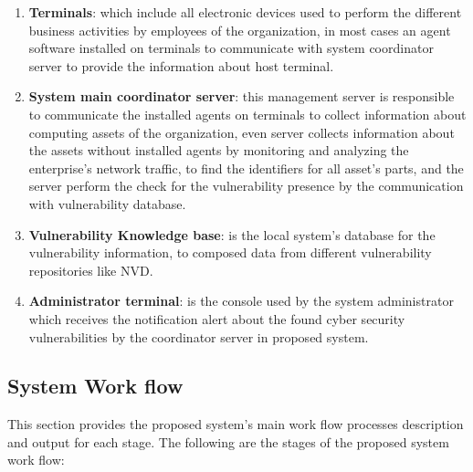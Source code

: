 \documentclass{llncs}
\begin{document}
\renewcommand{\labelenumi}{\Roman{enumi}}
 \begin{enumerate}
 \item \textbf{Terminals}: which include all electronic devices used to perform the different business activities by employees of the organization, in most cases
 an agent software installed on terminals to communicate with system coordinator server to provide the information about host terminal.
 
 \item \textbf{System main coordinator server}: this management server is responsible to communicate the installed agents on terminals to collect information about computing assets of the organization, even server collects information about the assets without installed agents by monitoring and analyzing the enterprise's network traffic, to find the identifiers for all asset's parts, and  the server perform the check for the vulnerability presence by the communication with vulnerability database. 
 
 \item \textbf{Vulnerability Knowledge base}: is the local system's database for the vulnerability information, to composed data from different vulnerability repositories like NVD.
 
 
  \item \textbf{Administrator terminal}: is the console used by the system administrator which receives the notification alert about the found cyber security vulnerabilities by the coordinator server in proposed system.   
 \end{enumerate}
 
\subsection{System Work flow}

\par This section provides the proposed system's main work flow processes description and output for each stage. 
The following are the stages of the proposed system work flow:
 
\end{document}
